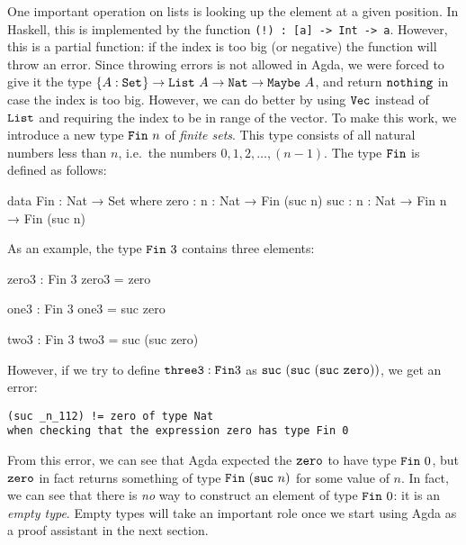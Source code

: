 \documentclass[a4paper,UKenglish]{tufte-handout}
\theoremstyle{definition}
\newcommand\prim[1]{{\AgdaPrimitive{#1}}}
\newcommand\ty[1]{{{\prim{Set}}_{#1}}}
\newcommand\fun[1]{{\AgdaFunction{#1}}}
\newcommand\data[1]{{\AgdaFunction{#1}}}
\newcommand\con[1]{{\AgdaInductiveConstructor{#1}}}
\newcommand\Nat{\data{Nat}}
\newcommand\zero{\con{zero}}
\newcommand\suc{\con{suc}}
\newcommand\List{\data{List}}
\renewcommand\Vec{\data{Vec}}
\newcommand\Fin{\data{Fin}}
\begin{document}
One important operation on lists is looking up the element at a given
position. In Haskell, this is implemented by the function
\texttt{(!)~:~[a] -> Int -> a}. However, this is a partial function:
if the index is too big (or negative) the function will throw an
error. Since throwing errors is not allowed in Agda, we were forced to
give it the type $\{A : \ty{}\} \to \List\ A \to \Nat \to
\data{Maybe}\ A$, and return $\con{nothing}$ in case the index is too
big. However, we can do better by using $\Vec$ instead of $\List$ and
requiring the index to be in range of the vector. To make this work,
we introduce a new type $\Fin\ n$ of \emph{finite sets}. This type
consists of all natural numbers less than $n$, i.e.~the numbers
$0,1,2,\ldots,(n-1)$.  The type $\Fin$ is defined as follows:
\begin{code}[number]
data Fin : Nat → Set where
  zero  : {n : Nat} → Fin (suc n)
  suc   : {n : Nat} → Fin n → Fin (suc n)
\end{code}
As an example, the type $\Fin\ 3$ contains three elements:
\begin{code}[number]
zero3 : Fin 3
zero3 = zero

one3 : Fin 3
one3   = suc zero

two3 : Fin 3
two3   = suc (suc zero)
\end{code}
However, if we try to define $\fun{three3} : \Fin 3$ as
$\suc\ (\suc\ (\suc\ \zero))$, we get an error:
\begin{verbatim}
(suc _n_112) != zero of type Nat
when checking that the expression zero has type Fin 0
\end{verbatim}
From this error, we can see that Agda expected the $\zero$ to have
type $\Fin\ 0$, but $\zero$ in fact returns something of type
$\Fin\ (\suc\ n)$ for some value of $n$. In fact, we can see that
there is \emph{no} way to construct an element of type $\Fin\ 0$: it
is an \emph{empty type}. Empty types will take an important role once
we start using Agda as a proof assistant in the next section.
\end{document}
